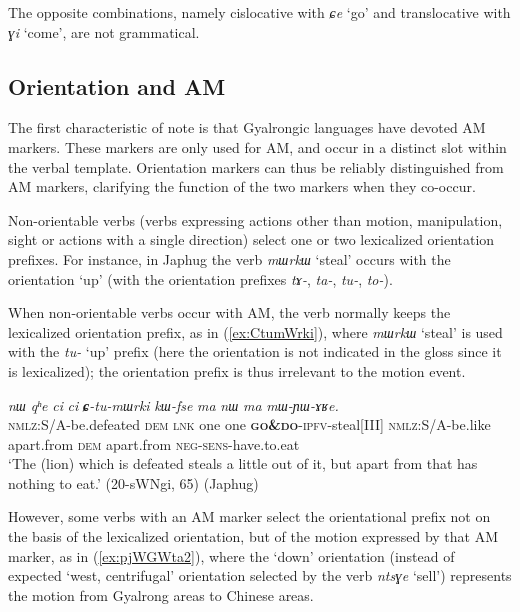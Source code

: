 \documentclass[oneside,a4paper,11pt]{article}
\newcommand{\ipa}[1]{{\phon\textit{#1}}}
\newcommand{\forme}[1]{\textit{\phon#1}}
\newcommand{\japhug}[2]{\textit{\phon#1} `#2'}
\newcommand{\rouge}[1]{\textbf{#1}}
\begin{document}
The opposite combinations, namely cislocative with \japhug{ɕe}{go} and translocative with \japhug{ɣi}{come}, are not grammatical. 



\subsection{Orientation and AM} \label{sec:orientation.japhug}
The first characteristic of note is that Gyalrongic languages have devoted AM markers.  These markers are only used for AM, and occur in a distinct slot within the verbal template.  Orientation markers can thus be reliably distinguished from AM markers, clarifying the function of the two markers when they co-occur.


Non-orientable verbs (verbs expressing actions other than motion, manipulation, sight or actions with a single direction) select one or two lexicalized orientation prefixes. For instance, in Japhug the verb \japhug{mɯrkɯ}{steal} occurs with the orientation `up' (with the orientation prefixes \forme{tɤ-}, \forme{ta-}, \forme{tu-}, \forme{to-}). 

When non-orientable verbs occur with AM, the verb normally keeps the lexicalized orientation prefix, as in (\ref{ex:CtumWrki}), where \japhug{mɯrkɯ}{steal} is used with the \forme{tu-} `up' prefix (here the orientation is not indicated in the gloss since it is lexicalized); the orientation prefix is thus irrelevant to the motion event. 

\begin{exe}
\ex \label{ex:CtumWrki}
 \gll \ipa{kɯ-nŋo}	\ipa{nɯ}	\ipa{qʰe}	\ipa{ci}	\ipa{ci}	\ipa{\rouge{ɕ}-tu-mɯrki}	\ipa{kɯ-fse}	\ipa{ma}	\ipa{nɯ}	\ipa{ma}	\ipa{mɯ-ɲɯ-ɤʁe.} \\
\textsc{nmlz}:S/A-be.defeated \textsc{dem} \textsc{lnk} one one \rouge{\textsc{go\&do}}-\textsc{ipfv}-steal[III] \textsc{nmlz}:S/A-be.like apart.from \textsc{dem} apart.from \textsc{neg}-\textsc{sens}-have.to.eat \\
\glt `The (lion) which is defeated steals a little out of it, but apart from that has nothing to eat.' (20-sWNgi, 65) (Japhug)
\end{exe}

However, some verbs with an AM marker select the orientational prefix not on the basis of the lexicalized orientation, but of the motion expressed by that AM marker, as in (\ref{ex:pjWGWta2}), where the `down' orientation (instead of expected `west, centrifugal' orientation selected by the verb \forme{ntsɣe} `sell') represents the motion from Gyalrong areas to Chinese areas.
\end{document}
